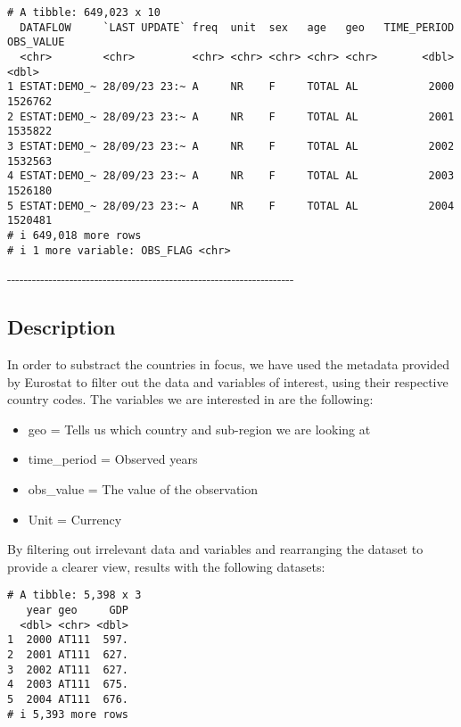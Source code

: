\documentclass[
  letterpaper,
  DIV=11,
  numbers=noendperiod]{scrartcl}
\providecommand{\tightlist}{%
  \setlength{\itemsep}{0pt}\setlength{\parskip}{0pt}}\usepackage{longtable,booktabs,array}
\begin{document}
\begin{verbatim}
# A tibble: 649,023 x 10
  DATAFLOW     `LAST UPDATE` freq  unit  sex   age   geo   TIME_PERIOD OBS_VALUE
  <chr>        <chr>         <chr> <chr> <chr> <chr> <chr>       <dbl>     <dbl>
1 ESTAT:DEMO_~ 28/09/23 23:~ A     NR    F     TOTAL AL           2000   1526762
2 ESTAT:DEMO_~ 28/09/23 23:~ A     NR    F     TOTAL AL           2001   1535822
3 ESTAT:DEMO_~ 28/09/23 23:~ A     NR    F     TOTAL AL           2002   1532563
4 ESTAT:DEMO_~ 28/09/23 23:~ A     NR    F     TOTAL AL           2003   1526180
5 ESTAT:DEMO_~ 28/09/23 23:~ A     NR    F     TOTAL AL           2004   1520481
# i 649,018 more rows
# i 1 more variable: OBS_FLAG <chr>
\end{verbatim}

-\/-\/-\/-\/-\/-\/-\/-\/-\/-\/-\/-\/-\/-\/-\/-\/-\/-\/-\/-\/-\/-\/-\/-\/-\/-\/-\/-\/-\/-\/-\/-\/-\/-\/-\/-\/-\/-\/-\/-\/-\/-\/-\/-\/-\/-\/-\/-\/-\/-\/-\/-\/-\/-\/-\/-\/-\/-\/-\/-\/-\/-\/-\/-\/-\/-\/-\/-\/-

\hypertarget{description}{%
\subsection{Description}\label{description}}

In order to substract the countries in focus, we have used the metadata
provided by Eurostat to filter out the data and variables of interest,
using their respective country codes. The variables we are interested in
are the following:

\begin{itemize}
\tightlist
\item
  geo = Tells us which country and sub-region we are looking at
\item
  time\_period = Observed years
\item
  obs\_value = The value of the observation
\item
  Unit = Currency
\end{itemize}

By filtering out irrelevant data and variables and rearranging the
dataset to provide a clearer view, results with the following datasets:

\begin{verbatim}
# A tibble: 5,398 x 3
   year geo     GDP
  <dbl> <chr> <dbl>
1  2000 AT111  597.
2  2001 AT111  627.
3  2002 AT111  627.
4  2003 AT111  675.
5  2004 AT111  676.
# i 5,393 more rows
\end{verbatim}
\end{document}

